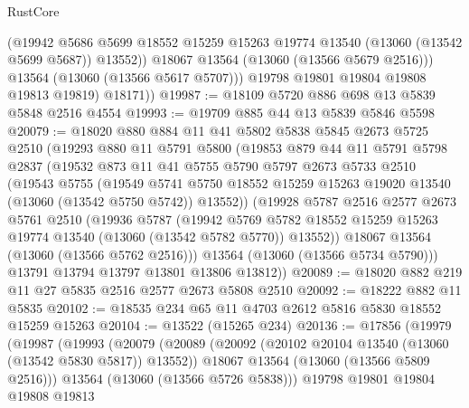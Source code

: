 \begin{lexlean}{RustCore}
\begin{coremodule}
                (@19942
                  @5686
                  @5699
                  @18552
                  @15259
                  @15263
                  @19774
                  @13540
                  (@13060 (@13542 @5699 @5687))
                  @13552))
              @18067
              @13564
              (@13060 (@13566 @5679 @2516)))
            @13564
            (@13060 (@13566 @5617 @5707)))
          @19798
          @19801
          @19804
          @19808
          @19813
          @19819)
        @18171))
@19987 := @18109 @5720 @886 @698 @13 @5839 @5848 @2516 @4554
@19993 := @19709 @885 @44 @13 @5839 @5846 @5598
@20079 := @18020
    @880
    @884
    @11
    @41
    @5802
    @5838
    @5845
    @2673
    @5725
    @2510
    (@19293
      @880
      @11
      @5791
      @5800
      (@19853
        @879
        @44
        @11
        @5791
        @5798
        @2837
        (@19532
          @873
          @11
          @41
          @5755
          @5790
          @5797
          @2673
          @5733
          @2510
          (@19543
            @5755
            (@19549
              @5741
              @5750
              @18552
              @15259
              @15263
              @19020
              @13540
              (@13060 (@13542 @5750 @5742))
              @13552))
          (@19928
            @5787
            @2516
            @2577
            @2673
            @5761
            @2510
            (@19936
              @5787
              (@19942
                @5769
                @5782
                @18552
                @15259
                @15263
                @19774
                @13540
                (@13060 (@13542 @5782 @5770))
                @13552))
            @18067
            @13564
            (@13060 (@13566 @5762 @2516)))
          @13564
          (@13060 (@13566 @5734 @5790)))
        @13791
        @13794
        @13797
        @13801
        @13806
        @13812))
@20089 := @18020 @882 @219 @11 @27 @5835 @2516 @2577 @2673 @5808 @2510
@20092 := @18222 @882 @11 @5835
@20102 := @18535 @234 @65 @11 @4703 @2612 @5816 @5830 @18552 @15259 @15263
@20104 := @13522 (@15265 @234)
@20136 := @17856
    (@19979
      (@19987
        (@19993
          (@20079
            (@20089
              (@20092 (@20102 @20104 @13540 (@13060 (@13542 @5830 @5817)) @13552))
              @18067
              @13564
              (@13060 (@13566 @5809 @2516)))
            @13564
            (@13060 (@13566 @5726 @5838)))
          @19798
          @19801
          @19804
          @19808
          @19813

\end{coremodule}
\end{lexlean}
